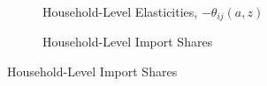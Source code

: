 \documentclass[12pt,pdftex]{article}
\begin{document}
\begin{onehalfspacing}
\begin{figure}[t!]
\centering
\begin{subfigure}{.45\textwidth}
\centering
{}
\caption{Household-Level Elasticities, $-\theta_{ij}(a,z)$}\label{fig:elasticity}
\end{subfigure}
\begin{subfigure}{.45\textwidth}
\centering
{}
\caption{Household-Level Import Shares}\label{fig:micro-trade}
\end{subfigure}
\end{figure}


\end{onehalfspacing}
\end{document}
